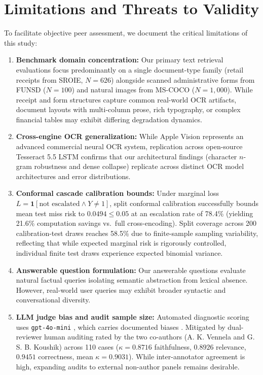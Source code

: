 \documentclass[conference]{IEEEtran}
\begin{document}
\section{Limitations and Threats to Validity}
\label{sec:limitations}
To facilitate objective peer assessment, we document the critical limitations of this study:
\begin{enumerate}
    \setlength{\itemsep}{0.2pt plus 0.1pt}
    \setlength{\parsep}{0pt}
    \setlength{\parskip}{0pt}
    \item \textbf{Benchmark domain concentration:} Our primary text retrieval evaluations focus predominantly on a single document-type family (retail receipts from SROIE, $N=626$) alongside scanned administrative forms from FUNSD ($N=100$) and natural images from MS-COCO ($N=1{,}000$). While receipt and form structures capture common real-world OCR artifacts, document layouts with multi-column prose, rich typography, or complex financial tables may exhibit differing degradation dynamics.
    \item \textbf{Cross-engine OCR generalization:} While Apple Vision represents an advanced commercial neural OCR system, replication across open-source Tesseract 5.5 LSTM confirms that our architectural findings (character $n$-gram robustness and dense collapse) replicate across distinct OCR model architectures and error distributions.
    \item \textbf{Conformal cascade calibration bounds:} Under marginal loss $L = \mathbf{1}[\text{not escalated} \land Y \ne 1]$, split conformal calibration successfully bounds mean test miss risk to $0.0494 \le 0.05$ at an escalation rate of 78.4\% (yielding 21.6\% computation savings vs.\ full cross-encoding). Split coverage across 200 calibration-test draws reaches 58.5\% due to finite-sample sampling variability, reflecting that while expected marginal risk is rigorously controlled, individual finite test draws experience expected binomial variance.
    \item \textbf{Answerable question formulation:} Our answerable questions evaluate natural factual queries isolating semantic abstraction from lexical absence. However, real-world user queries may exhibit broader syntactic and conversational diversity.
    \item \textbf{LLM judge bias and audit sample size:} Automated diagnostic scoring uses \texttt{gpt-4o-mini} \cite{openai2024gpt4o}, which carries documented biases \cite{zheng2023judging}. Mitigated by dual-reviewer human auditing rated by the two co-authors (A. K. Vennela and G. S. B. Koushik) across 110 cases ($\kappa = 0.8716$ faithfulness, $0.8926$ relevance, $0.9451$ correctness, mean $\kappa = 0.9031$). While inter-annotator agreement is high, expanding audits to external non-author panels remains desirable.

\end{enumerate}
\end{document}
